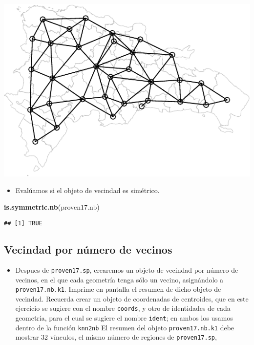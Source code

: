 \documentclass[11pt,]{article}
\newenvironment{Shaded}{\begin{snugshade}}{\end{snugshade}}
\newcommand{\KeywordTok}[1]{\textcolor[rgb]{0.13,0.29,0.53}{\textbf{#1}}}
\newcommand{\NormalTok}[1]{#1}
\providecommand{\tightlist}{%
\setlength{\itemsep}{0pt}\setlength{\parskip}{0pt}}
\begin{document}
\includegraphics{proyecto_files/figure-latex/unnamed-chunk-9-1.pdf}

\begin{itemize}
\tightlist
\item
  Evalúamos si el objeto de vecindad es simétrico.
\end{itemize}

\begin{Shaded}
\begin{Highlighting}[]
\KeywordTok{is.symmetric.nb}\NormalTok{(proven17.nb)}
\end{Highlighting}
\end{Shaded}

\begin{verbatim}
## [1] TRUE
\end{verbatim}

\subsection{Vecindad por número de
vecinos}\label{vecindad-por-nuxfamero-de-vecinos}

\begin{itemize}
\tightlist
\item
  Despues de \texttt{proven17.sp}, crearemos un objeto de vecindad por
  número de vecinos, en el que cada geometría tenga sólo un vecino,
  asignándolo a \texttt{proven17.nb.k1}. Imprime en pantalla el resumen
  de dicho objeto de vecindad. Recuerda crear un objeto de coordenadas
  de centroides, que en este ejercicio se sugiere con el nombre
  \texttt{coords}, y otro de identidades de cada geometría, para el cual
  se sugiere el nombre \texttt{ident}; en ambos los usamos dentro de la
  función \texttt{knn2nb} El resumen del objeto \texttt{proven17.nb.k1}
  debe mostrar 32 vínculos, el mismo número de regiones de
  \texttt{proven17.sp},
\end{itemize}
\end{document}
